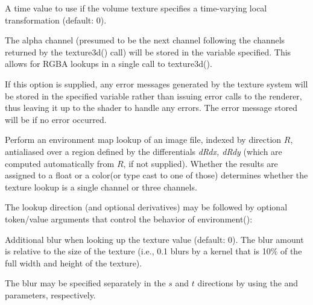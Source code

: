 \documentclass[11pt,letterpaper]{book}
\def\color{{\cf color}\xspace}
\def\float{{\cf float}\xspace}
\begin{document}
\vspace{12pt}
A time value to use if the volume texture specifies a time-varying
local transformation (default: 0).
\apiend
\vspace{-16pt}

\vspace{12pt}
The alpha channel (presumed to be the next channel following the
channels returned by the {\cf texture3d()} call) will be stored in the
variable specified.  This allows for RGBA lookups in a single call to
{\cf texture3d()}.
\apiend
\vspace{-16pt}

\vspace{12pt}
If this option is supplied, any error messages generated by the texture
system will be stored in the specified variable rather than issuing error
calls to the renderer, thus leaving it up to the shader to handle any
errors. The error message stored will be \qkw{} if no error occurred.
\apiend
\vspace{-16pt}

\apiend


Perform an environment map lookup of an image file, indexed by direction
$R$, antialiased over a region defined by the differentials
\emph{dRdx, dRdy} (which are computed
automatically from $R$, if not supplied).  Whether the results
are assigned to a \float or a \color (or type cast to one of those)
determines whether the texture lookup is a single channel or three
channels.

The lookup direction (and optional derivatives) may be followed by optional token/value
arguments that control the behavior of {\cf environment()}:

\vspace{12pt}
Additional blur when looking up the texture value (default: 0).  The
blur amount is relative to the size of the texture (i.e., 0.1 blurs by a
kernel that is 10\% of the full width and height of the texture).

The blur may be specified separately in the $s$ and $t$ directions by
using the  and  parameters, respectively.
\apiend
\vspace{-16pt}
\end{document}
